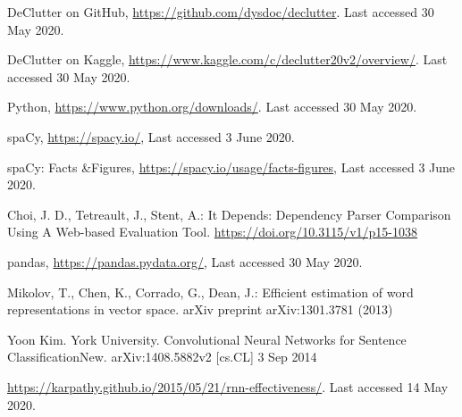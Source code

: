 \documentclass[runningheads]{llncs}
\begin{document}
%
%
\newpage
\begin{thebibliography}{8}
DeClutter on GitHub, \url{https://github.com/dysdoc/declutter}. Last accessed 30 May 2020.

DeClutter on Kaggle, \url{https://www.kaggle.com/c/declutter20v2/overview/}. Last accessed 30 May 2020.

Python, \url{https://www.python.org/downloads/}. Last accessed 30 May 2020.

spaCy, \url{https://spacy.io/}, Last accessed 3 June 2020.

spaCy: Facts \&Figures, \url{https://spacy.io/usage/facts-figures}, Last accessed 3 June 2020. 

Choi, J. D., Tetreault, J., Stent, A.: It Depends: Dependency Parser Comparison Using A Web-based Evaluation Tool. \url{https://doi.org/10.3115/v1/p15-1038}

pandas, \url{https://pandas.pydata.org/}, Last accessed 30 May 2020.

Mikolov, T., Chen, K., Corrado, G., Dean, J.: Efficient estimation of word representations in vector space. arXiv preprint arXiv:1301.3781 (2013)

Yoon Kim. York University. Convolutional Neural Networks for Sentence ClassificationNew. arXiv:1408.5882v2 [cs.CL] 3 Sep 2014

\url{https://karpathy.github.io/2015/05/21/rnn-effectiveness/}. Last accessed 14 May 2020.

\end{thebibliography}
\end{document}
